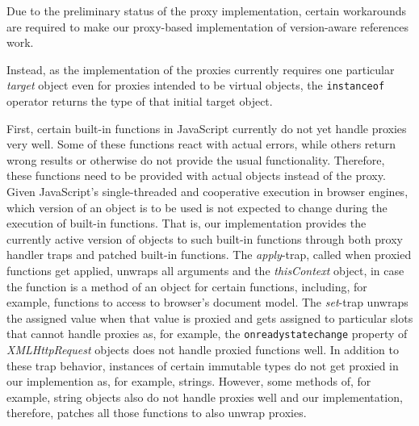 Due to the preliminary status of the proxy implementation, certain workarounds are required to make our proxy-based implementation of version-aware references work.


Instead, as the implementation of the proxies currently requires one particular \emph{target} object even for proxies intended to be virtual objects, the \lstinline{instanceof} operator returns the type of that initial target object.


First, certain built-in functions in JavaScript currently do not yet handle proxies very well.
Some of these functions react with actual errors, while others return wrong results or otherwise do not provide the usual functionality.
Therefore, these functions need to be provided with actual objects instead of the proxy.
Given JavaScript's single-threaded and cooperative execution in browser engines, which version of an object is to be used is not expected to change during the execution of built-in functions.
That is, our implementation provides the currently active version of objects to such built-in functions through both proxy handler traps and patched built-in functions.
The \emph{apply}-trap, called when proxied functions get applied, unwraps all arguments and the \emph{thisContext} object, in case the function is a method of an object for certain functions, including, for example, functions to access to browser's document model.
The \emph{set}-trap unwraps the assigned value when that value is proxied and gets assigned to particular slots that cannot handle proxies as, for example, the \lstinline{onreadystatechange} property of \emph{XMLHttpRequest} objects does not handle proxied functions well.
In addition to these trap behavior, instances of certain immutable types do not get proxied in our implemention as, for example, strings.
However, some methods of, for example, string objects also do not handle proxies well and our implementation, therefore, patches all those functions to also unwrap proxies.



